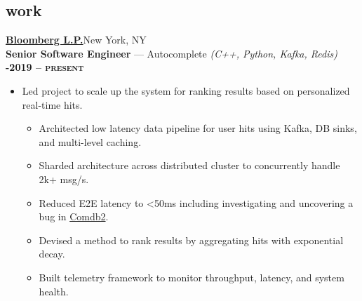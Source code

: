 \documentclass[margin,10pt]{res/res}
\begin{document}
\begin{resume}
\section{\sc \lsstyle work}
    \href{https://www.bloomberg.com/company/careers/working-here/engineering/}{\textbf{\large  {} Bloomberg L.P.}}\hfill New York, NY\\
    \textbf{Senior Software Engineer} --- Autocomplete
    \textit{(C++, Python, Kafka, Redis)}\hfill
    \textsc{\bfseries{}-2019 -- present}
    \vspace{0.5em}
    \begin{itemize}
        \item Led project to scale up the system for ranking results based on personalized real-time hits.
        \begin{itemize}
            \item Architected low latency data pipeline for user hits using Kafka, DB sinks, and multi-level caching.
            \item Sharded architecture across distributed cluster to concurrently handle 2k+ msg/s.
            \item Reduced E2E latency to <50ms including investigating and uncovering a bug in \href{https://en.wikipedia.org/wiki/Comdb2/}{Comdb2}.
            \item Devised a method to rank results by aggregating hits with exponential decay.
            \item Built telemetry framework to monitor throughput, latency, and system health.

\end{itemize}
\end{itemize}
\end{resume}
\end{document}
